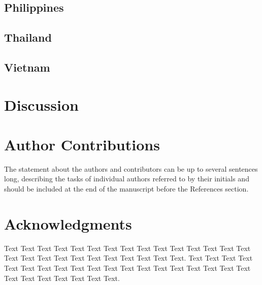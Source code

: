 \documentclass{frontiersSCNS} %
\begin{document}
\subsection{Philippines}

\subsection{Thailand}

\subsection{Vietnam}  

\section{Discussion}

 


\section*{Author Contributions}

The statement about the authors and contributors can be up to several sentences long, describing the tasks of individual authors referred to by their initials and should be included at the end of the manuscript before the References section.


\section*{Acknowledgments}
Text Text Text Text Text Text  Text Text Text Text Text Text Text Text  Text Text Text Text Text Text Text Text Text  Text Text Text. Text Text Text Text Text Text  Text Text Text Text Text Text Text Text  Text Text Text Text Text Text Text Text Text  Text Text Text. 
\end{document}
